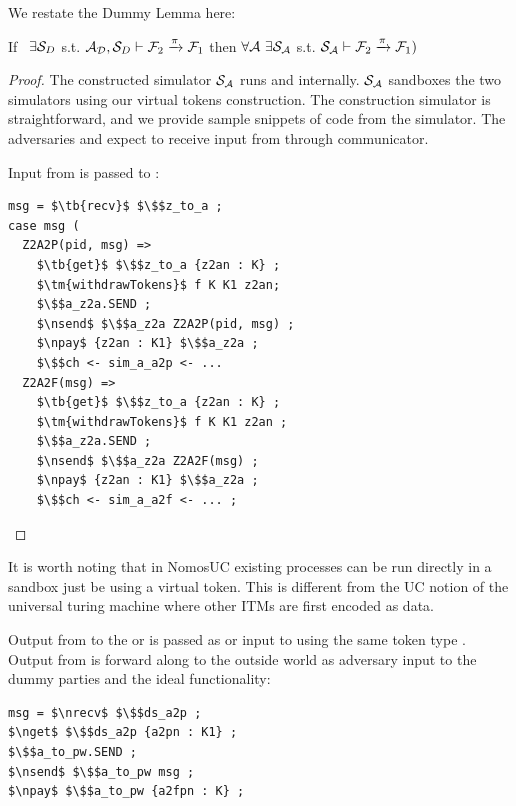 We restate the Dummy Lemma here:
\begin{theorem}\label{thm:dummy}
If \ $\exists \mathcal{S}_{D}$ s.t. $ \mathcal{A}_\mathcal{D}, \mathcal{S}_{D} \vdash \mathcal{F}_2 \xrightarrow{\pi} \mathcal{F}_1$ then $\forall \mathcal{A} \ \exists \mathcal{S}_\mathcal{A}$ s.t. $\mathcal{S}_{\mathcal{A}} \vdash  \mathcal{F}_2 \xrightarrow{\pi} \mathcal{F}_1)$ 
\end{theorem}

\begin{proof}
The constructed simulator $\mathcal{S}_\mathcal{A}$ runs \A and \DS internally.
$\mathcal{S}_\mathcal{A}$ sandboxes the two simulators using our virtual tokens construction.
The construction simulator is straightforward, and we provide sample snippets of code from the simulator.
The adversaries \A and \DS expect to receive input from \Z through communicator.

Input from \Z is passed to \A:
\begin{lstlisting}[basicstyle=\footnotesize\BeraMonottFamily, frame=single,  mathescape]
msg = $\tb{recv}$ $\$$z_to_a ;
case msg (
  Z2A2P(pid, msg) =>
    $\tb{get}$ $\$$z_to_a {z2an : K} ;
    $\tm{withdrawTokens}$ f K K1 z2an;
    $\$$a_z2a.SEND ;
    $\nsend$ $\$$a_z2a Z2A2P(pid, msg) ;
    $\npay$ {z2an : K1} $\$$a_z2a ;
    $\$$ch <- sim_a_a2p <- ... 
  Z2A2F(msg) =>
    $\tb{get}$ $\$$z_to_a {z2an : K} ;
    $\tm{withdrawTokens}$ f K K1 z2an ;
    $\$$a_z2a.SEND ;
    $\nsend$ $\$$a_z2a Z2A2F(msg) ;
    $\npay$ {z2an : K1} $\$$a_z2a ;
    $\$$ch <- sim_a_a2f <- ... ;
\end{lstlisting}
\end{proof}
It is worth noting that in NomosUC existing processes can be run directly in a sandbox just be using a virtual token.
This is different from the UC notion of the universal turing machine where other ITMs are first encoded as data.

Output from \A to the \partywrapper or \F is passed as  or  input to \DS using the same token type .
Output from \DS is forward along to the outside world as adversary input to the dummy parties and the ideal functionality:
\begin{lstlisting}[basicstyle=\footnotesize\BeraMonottFamily, frame=single, mathescape]
msg = $\nrecv$ $\$$ds_a2p ;
$\nget$ $\$$ds_a2p {a2pn : K1} ;
$\$$a_to_pw.SEND ;
$\nsend$ $\$$a_to_pw msg ;
$\npay$ $\$$a_to_pw {a2fpn : K} ;
\end{lstlisting}
